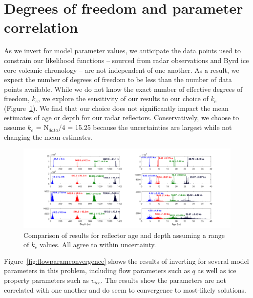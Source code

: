 \section{Degrees of freedom and parameter correlation}

As we invert for model parameter values, we anticipate the data points used to constrain our likelihood functions -- sourced from radar observations and Byrd ice core volcanic chronology -- are not independent of one another. As a result, we expect the number of degrees of freedom to be less than the number of data points available. While we do not know the exact number of effective degrees of freedom, $k_e$, we explore the sensitivity of our results to our choice of $k_e$ (Figure~\ref{fig:ke}). We find that our choice does not significantly impact the mean estimates of age or depth for our radar reflectors. Conservatively, we choose to assume $k_e$ = N$_{data}$/4 = 15.25 because the uncertainties are largest while not changing the mean estimates. 

\begin{figure}[ht]
\centering
\includegraphics[scale=0.3]{../analysis/figures/keCompare_tweaked}
\caption[]{Comparison of results for reflector age and depth assuming a range of $k_e$ values. All agree to within uncertainty.}
\label{fig:ke}
\end{figure}

Figure~\ref{fig:flowparamconvergence} shows the results of inverting for several model parameters in this problem, including flow parameters such as $q$ as well as ice property parameters such as $v_{ice}$. The results show the parameters are not correlated with one another and do seem to convergence to most-likely solutions.

